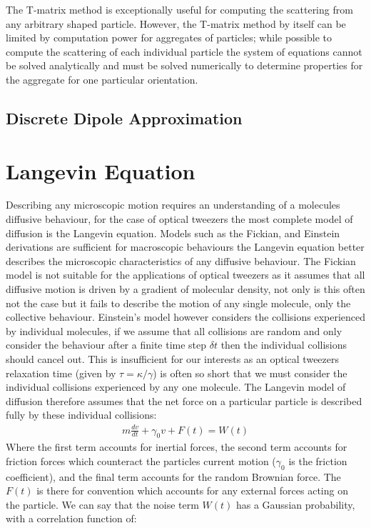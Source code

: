 The T-matrix method is exceptionally useful for computing the scattering from any arbitrary shaped particle. However, the T-matrix method by itself can be limited by computation power for aggregates of particles; while possible to compute the scattering of each individual particle the system of equations cannot be solved analytically and must be solved numerically to determine properties for the aggregate for one particular orientation. 

\subsection{Discrete Dipole Approximation}

\section{Langevin Equation}
Describing any microscopic motion requires an understanding of a molecules diffusive behaviour, for the case of optical tweezers the most complete model of diffusion is the Langevin equation. Models such as the Fickian, and Einstein derivations are sufficient for macroscopic behaviours the Langevin equation better describes the microscopic characteristics of any diffusive behaviour. The Fickian model is not suitable for the applications of optical tweezers as it assumes that all diffusive motion is driven by a gradient of molecular density, not only is this often not the case but it fails to describe the motion of any single molecule, only the collective behaviour. Einstein's model however considers the collisions experienced by individual molecules, if we assume that all collisions are random and only consider the behaviour after a finite time step $\delta t$ then the individual collisions should cancel out. This is insufficient for our interests as an optical tweezers relaxation time (given by $\tau = \kappa/\gamma$) is often so short that we must consider the individual collisions experienced by any one molecule. The Langevin model of diffusion therefore assumes that the net force on a particular particle is described fully by these individual collisions:
\begin{align}
	m\frac{dv}{dt} + \gamma_0 v + F(t) = W(t)
\end{align}
Where the first term accounts for inertial forces, the second term accounts for friction forces which counteract the particles current motion ($\gamma_0$ is the friction coefficient), and the final term accounts for the random Brownian force. The $F(t)$ is there for convention which accounts for any external forces acting on the particle. We can say that the noise term $W(t)$ has a Gaussian probability, with a correlation function of:

